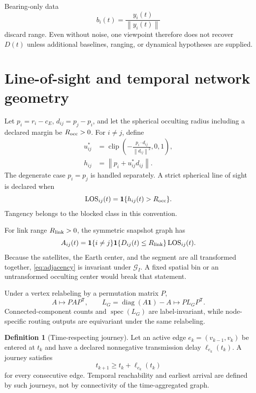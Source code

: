 \documentclass[11pt,a4paper]{article}
\theoremstyle{definition}
\newtheorem{definition}{Definition}[section]
\theoremstyle{plain}
\theoremstyle{remark}
\newcommand{\diag}{\operatorname{diag}}
\newcommand{\clip}{\operatorname{clip}}
\newcommand{\spec}{\operatorname{spec}}
\newcommand{\norm}[1]{\left\lVert #1\right\rVert}
\newcommand{\Gcal}{\mathcal G}
\begin{document}
Bearing-only data
\[
b_i(t)=\frac{y_i(t)}{\norm{y_i(t)}}
\]
discard range.  Even without noise, one viewpoint therefore does not
recover \(D(t)\) unless additional baselines, ranging, or dynamical
hypotheses are supplied.

\section{Line-of-sight and temporal network geometry}

Let \(p_i=r_i-c_E\), \(d_{ij}=p_j-p_i\), and let the spherical
occulting radius including a declared margin be \(R_{\rm occ}>0\).
For \(i\ne j\), define
\begin{align}
u^\ast_{ij}
&=\clip\!\left(
-\frac{p_i\cdot d_{ij}}{\norm{d_{ij}}^2},0,1\right),\label{eq:clip}\\
h_{ij}
&=\norm{p_i+u^\ast_{ij}d_{ij}}.\label{eq:clearance}
\end{align}
The degenerate case \(p_i=p_j\) is handled separately.  A strict
spherical line of sight is declared when
\begin{equation}\label{eq:los}
\operatorname{LOS}_{ij}(t)
=\bm1\{h_{ij}(t)>R_{\rm occ}\}.
\end{equation}
Tangency belongs to the blocked class in this convention.

For link range \(R_{\rm link}>0\), the symmetric snapshot graph has
\begin{equation}\label{eq:adjacency}
A_{ij}(t)=
\bm1\{i\ne j\}
\bm1\{D_{ij}(t)\le R_{\rm link}\}
\operatorname{LOS}_{ij}(t).
\end{equation}
Because the satellites, the Earth center, and the segment are all
transformed together, \cref{eq:adjacency} is invariant under
\(\Gcal_I\).  A fixed spatial bin or an untransformed occulting center
would break that statement.

Under a vertex relabeling by a permutation matrix \(P\),
\[
A\longmapsto PAP^\mathsf T,\qquad
L_G=\diag(A\bm1)-A
\longmapsto PL_GP^\mathsf T.
\]
Connected-component counts and \(\spec(L_G)\) are label-invariant,
while node-specific routing outputs are equivariant under the same
relabeling.

\begin{definition}[Time-respecting journey]
Let an active edge \(e_k=(v_{k-1},v_k)\) be entered at \(t_k\) and
have a declared nonnegative transmission delay
\(\ell_{e_k}(t_k)\).  A journey satisfies
\begin{equation}\label{eq:journey}
t_{k+1}\ge t_k+\ell_{e_k}(t_k)
\end{equation}
for every consecutive edge.  Temporal reachability and earliest
arrival are defined by such journeys, not by connectivity of the
time-aggregated graph.
\end{definition}
\end{document}
